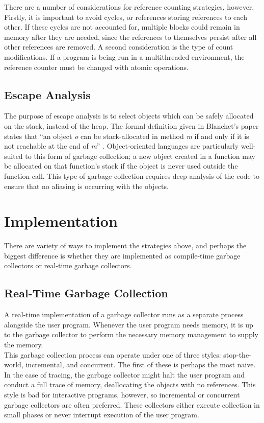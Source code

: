 \documentclass[12pt]{article}
\begin{document}
There are a number of considerations for reference counting strategies, however. Firstly, it is important to avoid cycles, or references storing references to each other. If these cycles are not accounted for, multiple blocks could remain in memory after they are needed, since the references to themselves persist after all other references are removed. A second consideration is the type of count modifications. If a program is being run in a multithreaded environment, the reference counter must be changed with atomic operations.
\subsection{Escape Analysis}
The purpose of escape analysis is to select objects which can be safely allocated on the stack, instead of the heap. The formal definition given in Blanchet's paper states that ``an object \textit{o} can be stack-allocated in method \textit{m} if and only if it is not reachable at the end of \textit{m}'' \cite{blan03}. Object-oriented languages are particularly well-suited to this form of garbage collection; a new object created in a function may be allocated on that function's stack if the object is never used outside the function call. This type of garbage collection requires deep analysis of the code to ensure that no aliasing is occurring with the objects.
\section{Implementation}
There are variety of ways to implement the strategies above, and perhaps the biggest difference is whether they are implemented as compile-time garbage collectors or real-time garbage collectors.
\subsection{Real-Time Garbage Collection}
A real-time implementation of a garbage collector runs as a separate process alongside the user program. Whenever the user program needs memory, it is up to the garbage collector to perform the necessary memory management to supply the memory.\\

This garbage collection process can operate under one of three styles: stop-the-world, incremental, and concurrent. The first of these is perhaps the most naive. In the case of tracing, the garbage collector might halt the user program and conduct a full trace of memory, deallocating the objects with no references. This style is bad for interactive programs, however, so incremental or concurrent garbage collectors are often preferred. These collectors either execute collection in small phases or never interrupt execution of the user program.\\
\end{document}
